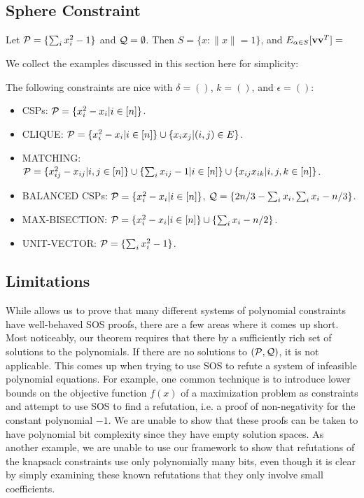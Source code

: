 \subsection{Sphere Constraint}
Let $\mathcal P = \{\sum_i x_i^2 - 1\}$ and $\mathcal Q = \emptyset$. Then $S = \{x: \|x\| = 1\}$, and $E_{\alpha \in S}[{\bf v}{\bf v}^T] = $

We collect the examples discussed in this section here for simplicity:
\begin{theorem}\label{thm:examples}
The following constraints are nice with $\delta = ()$, $k = ()$, and $\epsilon = ()$:
\begin{itemize}
\item CSPs: $\mathcal P = \{x_i^2 - x_i | i \in [n]\}$. 
\item CLIQUE: $\mathcal P = \{x_i^2 - x_i | i \in [n]\} \cup \{x_ix_j | (i,j) \in E\}$.
\item MATCHING: $\mathcal P = \{x_{ij}^2 - x_{ij} | i,j \in [n]\} \cup \{\sum_i x_{ij} - 1 | i \in [n]\} \cup \{x_{ij}x_{ik} | i,j,k \in [n]\}$.
\item BALANCED CSPs: $\mathcal P = \{x_i^2 - x_i | i \in [n]\}$, $\mathcal Q = \{2n/3 - \sum_i x_i, \sum_i x_i - n/3\}$.
\item MAX-BISECTION: $\mathcal P = \{x_i^2 - x_i | i \in [n]\} \cup \{\sum_i x_i - n/2\}$.
\item UNIT-VECTOR: $\mathcal P = \{\sum_i x_i^2 - 1\}$.
\end{itemize}
\end{theorem}

\subsection{Limitations}
While  allows us to prove that many different systems of polynomial constraints have well-behaved SOS proofs, there are a few areas where it comes up short. Most noticeably, our theorem requires that there by a sufficiently rich set of solutions to the polynomials. If there are no solutions to $(\mathcal P, \mathcal Q)$, it is not applicable. This comes up when trying to use SOS to refute a system of infeasible polynomial equations. For example, one common technique is to introduce lower bounds on the objective function $f(x)$ of a maximization problem as constraints and attempt to use SOS to find a refutation, i.e. a proof of non-negativity for the constant polynomial $-1$. We are unable to show that these proofs can be taken to have polynomial bit complexity since they have empty solution spaces. As another example, we are unable to use our framework to show that refutations of the knapsack constraints use only polynomially many bits, even though it is clear by simply examining these known refutations that they only involve small coefficients. 